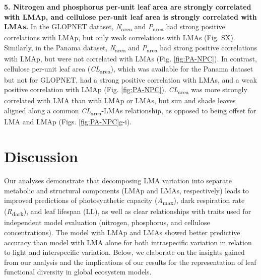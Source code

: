 \documentclass[
  12pt,
]{article}
\providecommand{\DIFaddtex}[1]{{\protect\color{blue}\uwave{#1}}} %
\providecommand{\DIFaddbegin}{} %
\providecommand{\DIFaddend}{} %
\providecommand{\DIFadd}[1]{\texorpdfstring{\DIFaddtex{#1}}{#1}} %
\newcommand{\DIFaddincludegraphics}[2][]{{\color{blue}\fbox{\DIFOincludegraphics[#1]{#2}}}} %
\DeclareRobustCommand{\DIFaddbegin}{\DIFOaddbegin \let\includegraphics\DIFaddincludegraphics} %
\DeclareRobustCommand{\DIFaddend}{\DIFOaddend \let\includegraphics\DIFOincludegraphics} %
\begin{document}
\textbf{5. Nitrogen and phosphorus per-unit leaf area are strongly correlated with LMAp, and cellulose per-unit leaf area is strongly correlated with LMAs.}
In the GLOPNET dataset, \emph{N}\textsubscript{area} and \emph{P}\textsubscript{area} had strong positive correlations with LMAp, but only weak correlations with LMAs (Fig. SX).
Similarly, in the Panama dataset, \emph{N}\textsubscript{area} and \emph{P}\textsubscript{area} had strong positive correlations with LMAp, but were not correlated with LMAs (Fig. \DIFaddbegin \DIFadd{Fig.~}\DIFaddend \ref{fig:PA-NPC}).
In contrast, cellulose per-unit leaf area (\emph{CL}\textsubscript{area}), which was available for the Panama dataset but not for GLOPNET, had a strong positive correlation with LMAs, and a weak positive correlation with LMAp (Fig. \DIFaddbegin \DIFadd{Fig.~}\DIFaddend \ref{fig:PA-NPC}).
\emph{CL}\textsubscript{area} was more strongly correlated with LMA than with LMAp or LMAs, but sun and shade leaves aligned along a common \emph{CL}\textsubscript{area}-LMAs relationship, as opposed to being offset for LMA and LMAp (Figs. \DIFaddbegin \DIFadd{Fig.~}\DIFaddend \ref{fig:PA-NPC}g-i).

\hypertarget{discussion}{%
\section{Discussion}\label{discussion}}

Our analyses demonstrate that decomposing LMA variation into separate metabolic and structural components (LMAp and LMAs, respectively) leads to improved predictions of photosynthetic capacity (\emph{A}\textsubscript{max}), dark respiration rate (\emph{R}\textsubscript{dark}), and leaf lifespan (LL), as well as clear relationships with traits used for independent model evaluation (nitrogen, phosphorus, and cellulose concentrations).
The model with LMAp and LMAs showed better predictive accuracy than model with LMA alone for both intraspecific variation in relation to light and interspecific variation.
Below, we elaborate on the insights gained from our analysis and the implications of our results for the representation of leaf functional diversity in global ecosystem models.
\end{document}
